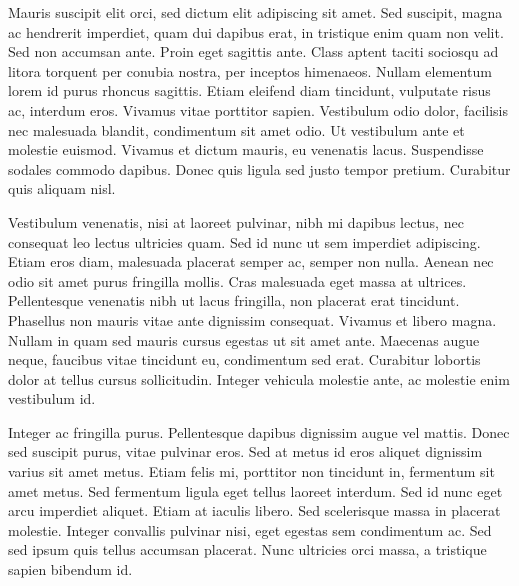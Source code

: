 \documentclass[11pt,a4paper]{memoir}\usepackage[]{graphicx}\usepackage[]{color}
\begin{document}
Mauris suscipit elit orci, sed dictum elit adipiscing sit amet. Sed suscipit, magna ac hendrerit imperdiet, quam dui dapibus erat, in tristique enim quam non velit. Sed non accumsan ante. Proin eget sagittis ante. Class aptent taciti sociosqu ad litora torquent per conubia nostra, per inceptos himenaeos. Nullam elementum lorem id purus rhoncus sagittis. Etiam eleifend diam tincidunt, vulputate risus ac, interdum eros. Vivamus vitae porttitor sapien. Vestibulum odio dolor, facilisis nec malesuada blandit, condimentum sit amet odio. Ut vestibulum ante et molestie euismod. Vivamus et dictum mauris, eu venenatis lacus. Suspendisse sodales commodo dapibus. Donec quis ligula sed justo tempor pretium. Curabitur quis aliquam nisl.

Vestibulum venenatis, nisi at laoreet pulvinar, nibh mi dapibus lectus, nec consequat leo lectus ultricies quam. Sed id nunc ut sem imperdiet adipiscing. Etiam eros diam, malesuada placerat semper ac, semper non nulla. Aenean nec odio sit amet purus fringilla mollis. Cras malesuada eget massa at ultrices. Pellentesque venenatis nibh ut lacus fringilla, non placerat erat tincidunt. Phasellus non mauris vitae ante dignissim consequat. Vivamus et libero magna. Nullam in quam sed mauris cursus egestas ut sit amet ante. Maecenas augue neque, faucibus vitae tincidunt eu, condimentum sed erat. Curabitur lobortis dolor at tellus cursus sollicitudin. Integer vehicula molestie ante, ac molestie enim vestibulum id.

Integer ac fringilla purus. Pellentesque dapibus dignissim augue vel mattis. Donec sed suscipit purus, vitae pulvinar eros. Sed at metus id eros aliquet dignissim varius sit amet metus. Etiam felis mi, porttitor non tincidunt in, fermentum sit amet metus. Sed fermentum ligula eget tellus laoreet interdum. Sed id nunc eget arcu imperdiet aliquet. Etiam at iaculis libero. Sed scelerisque massa in placerat molestie. Integer convallis pulvinar nisi, eget egestas sem condimentum ac. Sed sed ipsum quis tellus accumsan placerat. Nunc ultricies orci massa, a tristique sapien bibendum id.
\end{document}
